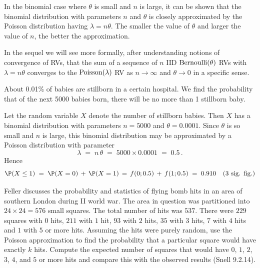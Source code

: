 \begin{rem}
In the binomial case where $\theta$ is small and $n$ is large, it can be shown that the
binomial distribution with parameters $n$ and $\theta$ is closely
approximated by the Poisson distribution having $\lambda = n \theta$. The
smaller the value of $\theta$ and larger the value of $n$, the better the approximation.

In the sequel we will see more formally, after understanding notions of convergence of RVs, that the sum of a sequence of $n$ IID $\mbox{{\rm Bernoulli}}(\theta)$ RVs with $\lambda = n \theta$ converges to the $\mbox{{\rm Poisson}}(\lambda)$ RV as $n \to \infty$ and $\theta \to 0$ in a specific sense.
\end{rem}

\begin{example}\label{Eg:still-born}
{ About 0.01\% of babies are stillborn in a certain hospital. We find the probability that of
  the next 5000 babies born, there will be no more than 1 stillborn baby.

  Let the random variable $X$ denote the number of
stillborn babies. Then $X$ has a binomial distribution with parameters
$n=5000$ and $\theta = 0.0001$.  Since $\theta$ is so small and $n$ is
large, this
binomial distribution may be approximated by a Poisson distribution
  with parameter
\[\lambda\;=\; n\,\theta\;=\; 5000 \times 0.0001 \;=\; 0.5\,. \]
Hence
 \[\P(X\leq 1)\;=\; \P(X=0)\,+\, \P(X=1)\,=\, f(0;0.5) \,+\, f(1;0.5)\;=\; 0.910 \quad (\text{3 sig. fig.})\]
}
\end{example}

\begin{Exercise}[title={Nazi Bombs on London},label={xbombsOnLondon}]
Feller discusses the probability and statistics of flying bomb hits in an area of southern London during II world war.  
The area in question was partitioned into $24 \times 24 = 576$ small squares.  
The total number of hits was $537$.  
There were $229$ squares with $0$ hits, $211$ with $1$ hit, $93$ with $2$ hits, $35$ with $3$ hits, $7$ with $4$ hits and $1$ with $5$ or more hits.  
Assuming the hits were purely random, use the Poisson approximation to find the probability that a particular square would have exactly $k$ hits.  Compute the expected number of squares that would have $0$, $1$, $2$, $3$, $4$, and $5$ or more hits and compare this with the observed results (Snell 9.2.14).  
\end{Exercise}

